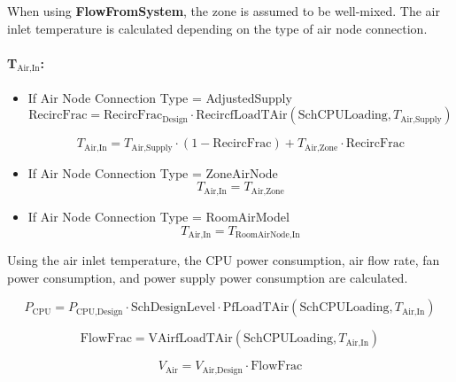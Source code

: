 When using \textbf{FlowFromSystem}, the zone is assumed to be well-mixed. The air inlet temperature is calculated depending on the type of air node connection.

\paragraph{T$_\textrm{Air,In}$:}

\begin{itemize}
    \tightlist
  \item
    If Air Node Connection Type = AdjustedSupply
\begin{equation}
\textrm{RecircFrac} = \textrm{RecircFrac}_{\textrm{Design}} \cdot \textrm{RecircfLoadTAir}(\textrm{SchCPULoading}, T_{\textrm{Air,Supply}})
\end{equation}

\begin{equation}
T_{\textrm{Air,In}} = T_{\textrm{Air,Supply}} \cdot (1 - \textrm{RecircFrac}) + T_{\textrm{Air,Zone}} \cdot \textrm{RecircFrac}
\end{equation}

  \item
    If Air Node Connection Type = ZoneAirNode
\begin{equation}
T_{\textrm{Air,In}} = T_{\textrm{Air,Zone}}
\end{equation}

  \item
    If Air Node Connection Type = RoomAirModel
\begin{equation}
T_{\textrm{Air,In}} = T_{\textrm{RoomAirNode,In}}
\end{equation}

\end{itemize}

Using the air inlet temperature, the CPU power consumption, air flow rate, fan power consumption, and power supply power consumption are calculated.

\begin{equation}
P_{\textrm{CPU}} = P_{\textrm{CPU,Design}} \cdot \textrm{SchDesignLevel} \cdot \textrm{PfLoadTAir}(\textrm{SchCPULoading}, T_{\textrm{Air,In}})
\end{equation}

\begin{equation}
\textrm{FlowFrac} = \textrm{VAirfLoadTAir}(\textrm{SchCPULoading}, T_{\textrm{Air,In}})
\end{equation}

\begin{equation}
V_{\textrm{Air}} = V_{\textrm{Air,Design}} \cdot \textrm{FlowFrac}
\end{equation}

